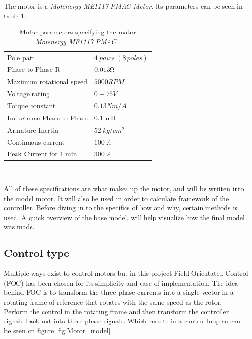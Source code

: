 
The motor is a \textit{Motenergy ME1117 PMAC Motor}. Its parameters can be seen in table \ref{Motor_parameters_list}.

\begin{table} [H]
    \centering
    \begin{tabular}{|l|l|} \cline{1-2}
        Pole pair                   & $4\ pairs\ (8\ poles)$        \\ \cline{1-2}
        Phase to Phase R            & $0.013\ohm$                   \\ \cline{1-2}
        Maximum rotational speed    & $5000 RPM$                    \\ \cline{1-2}
        Voltage rating              & $0-76 V$                      \\ \cline{1-2}
        Torque constant             & $0.13 Nm/A$                   \\ \cline{1-2}
        Inductance Phase to Phase   & $0.1$ mH                      \\ \cline{1-2}
        Armature Inertia            & $52\ kg/cm^2$                 \\ \cline{1-2}
        Continuous current          & $100\ A$                      \\ \cline{1-2}
        Peak Current for 1 min      & $300\ A$                      \\ \cline{1-2}  
    \end{tabular} \\
    \caption{Motor parameters specifying the motor \textit{Motenergy ME1117 PMAC} \cite{Motor_Parameters}.}
    \label{Motor_parameters_list}
\end{table} 

All of these specifications are what makes up the motor, and will be written into the model motor. It will also be used in order to calculate framework of the controller. Before diving in to the specifics of how and why, certain methods is used. A quick overview of the base model, will help visualize how the final model was made.\\

\subsection{Control type}
Multiple ways exist to control motors but in this project Field Orientated Control (FOC) has been chosen for its simplicity and ease of implementation. The idea behind FOC is to transform the three phase currents into a single vector in a rotating frame of reference that rotates with the same speed as the rotor. Perform the control in the rotating frame and then transform the controller signals back out into three phase signals. Which results in a control loop as can be seen on figure \ref{fig:Motor_model}.

